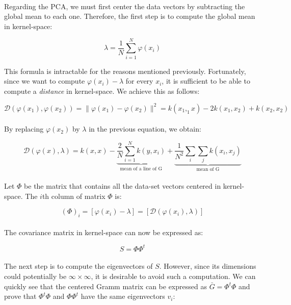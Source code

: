 \paragraph{}
Regarding the PCA, we must first center the data vectors by subtracting the global mean to each one.
Therefore, the first step is to compute the global mean in kernel-space:

$$\lambda = \frac{1}{N}\sum_{i = 1}^{N} \varphi(x_i)$$

This formula is intractable for the reasons mentioned previously. Fortunately, since we want to
compute $\varphi(x_i) - \lambda$ for every $x_i$, it is sufficient to be able to compute a
\emph{distance} in kernel-space. We achieve this as follows:

$$\mathcal{D}(\varphi(x_1), \varphi(x_2)) = \|\varphi(x_1) - \varphi(x_2)\|^2 = k(x_1, _1x) - 2k(x_1, x_2) +
k(x_2, x_2)$$

\paragraph{}
By replacing $\varphi(x_2)$ by $\lambda$ in the previous equation, we obtain:

$$\mathcal{D}(\varphi(x), \lambda) = k(x, x) - \underbrace{\frac{2}{N}\sum_{i = 1}^N k(y,
x_i)}_{\text{mean of a line of G}} + \underbrace{\frac{1}{N^2}\sum_i\sum_j k(x_i, x_j)}_{\text{mean
of G}}$$

\paragraph{}
Let $\Phi$ be the matrix that contains all the data-set vectors centered in
kernel-space. The $i$th column of matrix $\Phi$ is:

$$(\Phi)_i = [\varphi(x_i) - \lambda] = [\mathcal{D}(\varphi(x_i), \lambda)]$$

\paragraph{} The covariance matrix in kernel-space can now be expressed as:

$$S = \Phi\Phi^t$$

\paragraph{} The next step is to compute the eigenvectors of $S$. However, since its dimensions could
potentially be
$\infty \times \infty$, it is desirable to avoid such a computation. We can quickly see that the centered Gramm
matrix can be expressed as $\bar{G} = \Phi^t\Phi$ and prove that $\Phi^t\Phi$ and $\Phi\Phi^t$ have the same
eigenvectors $v_i$:

